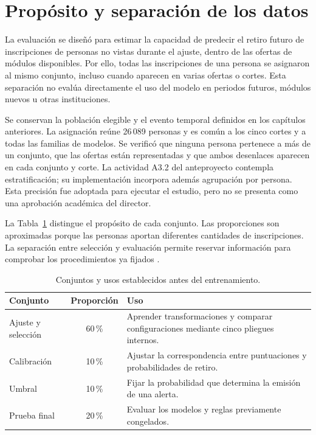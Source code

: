 \label{editorial:modelos}
\section{Propósito y separación de los datos}
La evaluación se diseñó para estimar la capacidad de predecir el retiro futuro de inscripciones de personas no vistas durante el ajuste, dentro de las ofertas de módulos disponibles. Por ello, todas las inscripciones de una persona se asignaron al mismo conjunto, incluso cuando aparecen en varias ofertas o cortes. Esta separación no evalúa directamente el uso del modelo en periodos futuros, módulos nuevos u otras instituciones.

Se conservan la población elegible y el evento temporal definidos en los capítulos anteriores. La asignación reúne 26\,089 personas y es común a los cinco cortes y a todas las familias de modelos. Se verificó que ninguna persona pertenece a más de un conjunto, que las ofertas están representadas y que ambos desenlaces aparecen en cada conjunto y corte. La actividad A3.2 del anteproyecto contempla estratificación; su implementación incorpora además agrupación por persona. Esta precisión fue adoptada para ejecutar el estudio, pero no se presenta como una aprobación académica del director.

La Tabla~\ref{modelos:conjuntos} distingue el propósito de cada conjunto. Las proporciones son aproximadas porque las personas aportan diferentes cantidades de inscripciones. La separación entre selección y evaluación permite reservar información para comprobar los procedimientos ya fijados \cite{modeloscv2026}.

\begin{table}[!htbp]\centering
\caption{Conjuntos y usos establecidos antes del entrenamiento.}\label{modelos:conjuntos}
\begin{tabular}{p{.21\linewidth}cp{.58\linewidth}}
\toprule
\textbf{Conjunto} & \textbf{Proporción} & \textbf{Uso}\\
\midrule
Ajuste y selección & 60\,\% & Aprender transformaciones y comparar configuraciones mediante cinco pliegues internos.\\
Calibración & 10\,\% & Ajustar la correspondencia entre puntuaciones y probabilidades de retiro.\\
Umbral & 10\,\% & Fijar la probabilidad que determina la emisión de una alerta.\\
Prueba final & 20\,\% & Evaluar los modelos y reglas previamente congelados.\\
\bottomrule
\end{tabular}
\end{table}

